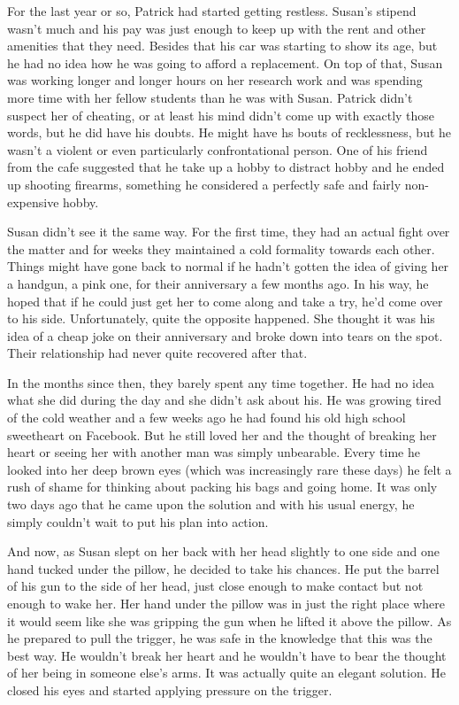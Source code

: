 \documentclass[11pt,letterpaper]{article}
\begin{document}
For the last year or so, Patrick had started getting restless. Susan's stipend wasn't much and his pay was just enough to keep up with the rent and other amenities that they need. Besides that his car was starting to show its age, but he had no idea how he was going to afford a replacement. On top of that, Susan was working longer and longer hours on her research work and was spending more time with her fellow students than he was with Susan. Patrick didn't suspect her of cheating, or at least his mind didn't come up with exactly those words, but he did have his doubts. He might have hs bouts of recklessness, but he wasn't a violent or even particularly confrontational person. One of his friend from the cafe suggested that he take up a hobby to distract hobby and he ended up shooting firearms, something he considered a perfectly safe and fairly non-expensive hobby.

Susan didn't see it the same way. For the first time, they had an actual fight over the matter and for weeks they maintained a cold formality towards each other. Things might have gone back to normal if he hadn't gotten the idea of giving her a handgun, a pink one, for their anniversary a few months ago. In his way, he hoped that if he could just get her to come along and take a try, he'd come over to his side. Unfortunately, quite the opposite happened. She thought it was his idea of a cheap joke on their anniversary and broke down into tears on the spot. Their relationship had never quite recovered after that.

In the months since then, they barely spent any time together. He had no idea what she did during the day and she didn't ask about his. He was growing tired of the cold weather and a few weeks ago he had found his old high school sweetheart on Facebook. But he still loved her and the thought of breaking her heart or seeing her with another man was simply unbearable. Every time he looked into her deep brown eyes (which was increasingly rare these days) he felt a rush of shame for thinking about packing his bags and going home. It was only two days ago that he came upon the solution and with his usual energy, he simply couldn't wait to put his plan into action.

And now, as Susan slept on her back with her head slightly to one side and one hand tucked under the pillow, he decided to take his chances. He put the barrel of his gun to the side of her head, just close enough to make contact but not enough to wake her. Her hand under the pillow was in just the right place where it would seem like she was gripping the gun when he lifted it above the pillow. As he prepared to pull the trigger, he was safe in the knowledge that this was the best way. He wouldn't break her heart and he wouldn't have to bear the thought of her being in someone else's arms. It was actually quite an elegant solution. He closed his eyes and started applying pressure on the trigger.
\end{document}
